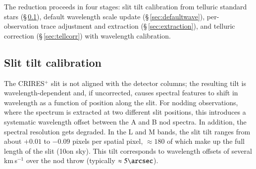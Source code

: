 \documentclass{aa}
\newcommand{\crires}{CRIRES$^+$}
\newcommand{\kms}{km\,s$^{-1}$}
\begin{document}
The reduction proceeds in four stages: slit tilt calibration from
telluric standard stars (\S\,\ref{sec:tilt}), default wavelength scale
update (\S\,\ref{sec:defaultwave}), per-observation trace adjustment and
extraction (\S\,\ref{sec:extraction}), and telluric correction
(\S\,\ref{sec:tellcorr}) with wavelength calibration.


\subsection{Slit tilt calibration}
\label{sec:tilt}

The \crires{} slit is not aligned with the detector columns;
the resulting tilt is wavelength-dependent and, if uncorrected, causes
spectral features to shift in wavelength as a function of position along
the slit. For nodding observations, where the spectrum is extracted at
two different slit positions, this introduces a systematic wavelength
offset between the A and B nod spectra. In addition, the spectral resolution
gets degraded.
In the L and M bands, the slit
tilt ranges from about $+0.01$ to $-0.09$ pixels per spatial pixel, $\approx 180$ of
which make up the full length of the slit (10\arcsec on sky). This tilt corresponds
to wavelength offsets of several \kms{} over the nod throw (typically $\approx 5\arcsec$).
\end{document}
